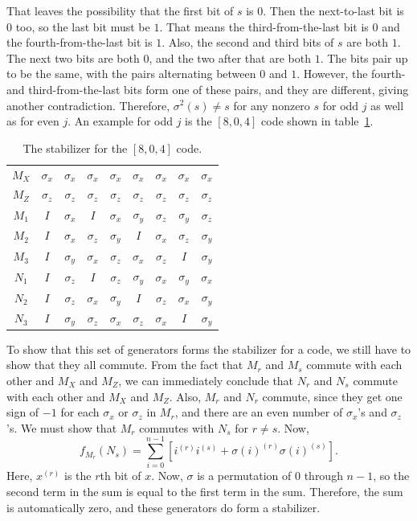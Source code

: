 \documentclass{report}
\newcommand{\X}{\sigma_x}
\newcommand{\Z}{\sigma_z}
\newcommand{\Y}{\sigma_y}
\newcommand{\Sum}{\sum}
\begin{document}
That leaves the possibility that the first bit of $s$ is $0$.  Then the
next-to-last bit is $0$ too, so the last bit must be $1$.  That means the 
third-from-the-last bit is $0$ and the fourth-from-the-last bit is $1$.  Also, 
the second and third bits of $s$ are both $1$.  The next two bits are both 
$0$, and the two after that are both $1$.  The bits pair up to be the same, 
with the pairs alternating between $0$ and $1$.  However, the fourth- and 
third-from-the-last bits form one of these pairs, and they are different, 
giving another contradiction.  Therefore, $\sigma^2 (s) \neq s$ for any 
nonzero $s$ for odd $j$ as well as for even $j$.  An example for odd $j$ is 
the $[8, 0, 4]$ code shown in table~\ref{table-8qubit-dist4}.
\begin{table}
\centering
\begin{tabular}{c|cccccccc}
$M_X$ & $\X$ & $\X$ & $\X$ & $\X$ & $\X$ & $\X$ & $\X$ & $\X$ \\
$M_Z$ & $\Z$ & $\Z$ & $\Z$ & $\Z$ & $\Z$ & $\Z$ & $\Z$ & $\Z$ \\
$M_1$ & $I$ & $\X$ & $I$ & $\X$ & $\Y$ & $\Z$ & $\Y$ & $\Z$ \\
$M_2$ & $I$ & $\X$ & $\Z$ & $\Y$ & $I$ & $\X$ & $\Z$ & $\Y$ \\
$M_3$ & $I$ & $\Y$ & $\X$ & $\Z$ & $\X$ & $\Z$ & $I$ & $\Y$ \\
$N_1$ & $I$ & $\Z$ & $I$ & $\Z$ & $\Y$ & $\X$ & $\Y$ & $\X$ \\
$N_2$ & $I$ & $\Z$ & $\X$ & $\Y$ & $I$ & $\Z$ & $\X$ & $\Y$ \\
$N_3$ & $I$ & $\Y$ & $\Z$ & $\X$ & $\Z$ & $\X$ & $I$ & $\Y$ \\
\end{tabular}
\caption{The stabilizer for the $[8, 0, 4]$ code.}
\label{table-8qubit-dist4}
\end{table}

To show that this set of generators forms the stabilizer for a code, we still 
have to show that they all commute.  From the fact that $M_r$ and $M_s$ 
commute with each other and $M_X$ and $M_Z$, we can immediately 
conclude that $N_r$ and $N_s$ commute with each other and $M_X$ and 
$M_Z$.  Also, $M_r$ and $N_r$ commute, since they get one sign of $-1$ 
for each $\X$ or $\Z$ in $M_r$, and there are an even number of $\X$'s and 
$\Z$'s.  We must show that $M_r$ commutes with $N_s$ for $r \neq s$.  Now,
\begin{equation}
f_{M_r} (N_s) = \Sum_{i=0}^{n-1} \left[i^{(r)} i^{(s)} + \sigma(i)^{(r)} 
\sigma(i)^{(s)} \right].
\end{equation}
Here, $x^{(r)}$ is the $r$th bit of $x$.  Now, $\sigma$ is a permutation of 
$0$ through $n-1$, so the second term in the sum is equal to the first term 
in the sum.  Therefore, the sum is automatically zero, and these generators 
do form a stabilizer.
\end{document}
